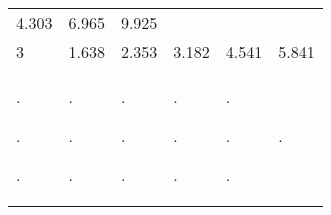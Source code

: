 \documentclass[]{book}
\begin{document}
\begin{longtable}[]{@{}llllll@{}}
\begin{minipage}[t]{0.10\columnwidth}
4.303\strut
\end{minipage} & \begin{minipage}[t]{0.14\columnwidth}\raggedright
6.965\strut
\end{minipage} & \begin{minipage}[t]{0.10\columnwidth}\raggedright
9.925\strut
\end{minipage}\tabularnewline
\begin{minipage}[t]{0.32\columnwidth}\raggedright
3\strut
\end{minipage} & \begin{minipage}[t]{0.09\columnwidth}\raggedright
1.638\strut
\end{minipage} & \begin{minipage}[t]{0.09\columnwidth}\raggedright
2.353\strut
\end{minipage} & \begin{minipage}[t]{0.10\columnwidth}\raggedright
3.182\strut
\end{minipage} & \begin{minipage}[t]{0.14\columnwidth}\raggedright
4.541\strut
\end{minipage} & \begin{minipage}[t]{0.10\columnwidth}\raggedright
5.841\strut
\end{minipage}\tabularnewline
\begin{minipage}[t]{0.32\columnwidth}\raggedright
.

.

.\strut
\end{minipage} & \begin{minipage}[t]{0.09\columnwidth}\raggedright
.

.

.\strut
\end{minipage} & \begin{minipage}[t]{0.09\columnwidth}\raggedright
.

.

.\strut
\end{minipage} & \begin{minipage}[t]{0.10\columnwidth}\raggedright
.

.

.\strut
\end{minipage} & \begin{minipage}[t]{0.14\columnwidth}\raggedright
.

.

.\strut
\end{minipage} & \begin{minipage}[t]{0.10\columnwidth}\raggedright
.


\end{minipage}
\end{longtable}
\end{document}
